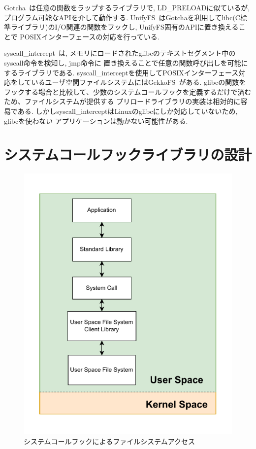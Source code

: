 \documentclass[a4paper,11pt]{jreport}
\begin{document}
Gotcha~\cite{gotcha}は任意の関数をラップするライブラリで, LD\_PRELOADに似ているが, プログラム可能なAPIを介して動作する. 
UnifyFS~\cite{10177390}はGotchaを利用してlibc(C標準ライブラリ)のI/O関連の関数をフックし, UnifyFS固有のAPIに置き換えることで
POSIXインターフェースの対応を行っている.

syscall\_intercept~\cite{syscall-intercept}は, メモリにロードされたglibcのテキストセグメント中のsyscall命令を検知し, jmp命令に
置き換えることで任意の関数呼び出しを可能にするライブラリである.
syscall\_interceptを使用してPOSIXインターフェース対応をしているユーザ空間ファイルシステムにはGekkoFS~\cite{8514892}がある.
glibcの関数をフックする場合と比較して、少数のシステムコールフックを定義するだけで済むため、ファイルシステムが提供する
プリロードライブラリの実装は相対的に容易である. しかしsyscall\_interceptはLinuxのglibcにしか対応していないため, glibcを使わない
アプリケーションは動かない可能性がある.

\chapter{システムコールフックライブラリの設計}

\begin{figure}[h]
	\begin{minipage}[b]{1\columnwidth}
		\centering
		\includegraphics[width=0.9\linewidth]{./figure/syscall_hook.pdf}
		\caption{システムコールフックによるファイルシステムアクセス}
		\label{fig:Syscall hook}
	\end{minipage}
\end{figure}
\end{document}
